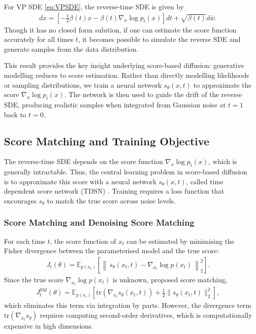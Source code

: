 \documentclass[a4paper,12pt]{article}
\begin{document}
For VP SDE \cref{eq:VPSDE}, the reverse-time SDE is given by
\begin{align*}
    dx=\left[-\frac{1}{2}\beta\!\left(t\right)x-\beta\!\left(t\right)\nabla_x \log p_t(x)\right]dt+\sqrt{\beta\!\left(t\right)}d\bar w.
\end{align*}
Though it has no closed form sulution, if one can estimate the score function accurately for all times \(t\), it becomes possible to simulate the reverse SDE and generate samples from the data distribution.

This result provides the key insight underlying score-based diffusion: generative modelling reduces to score estimation. 
Rather than directly modelling likelihoods or sampling distributions, we train a neural network \(s_\theta(x,t)\) to approximate the score \(\nabla_x \log p_t(x)\). The network is then used to guide the drift of the reverse SDE, producing realistic samples when integrated from Gaussian noise at \(t = 1\) back to \(t = 0\).

\subsection{Score Matching and Training Objective}
The reverse-time SDE depends on the score function \(\nabla_x \log p_t(x)\), which is generally intractable. Thus, the central learning problem in score-based diffusion is to approximate this score with a neural network \(s_\theta(x,t)\), called time dependent score network (TDSN) \citep{song2021ScoreBasedGenerativeModeling}. Training requires a loss function that encourages \(s_\theta\) to match the true score across noise levels.

\subsubsection{Score Matching and Denoising Score Matching}\label{sec:SM-and-DSM}
For each time \(t\), the score function of \(x_t\) can be estimated by minimising the Fisher divergence between the parameterised model and the true score:
\begin{align}\label{eq:FD}
    J_t(\theta)
    = \mathbb{E}_{p(x_t)}\!\left[\left\|\,s_\theta(x_t,t)-\nabla_{x_t}\log p(x_t)\,\right\|_2^2\right].
\end{align}
Since the true score $\nabla_{x_t}\log p(x_t)$ is unknown, \citet{hyvarinenEstimationNonNormalizedStatistical2005} proposed score matching,
\begin{align*}
    J_t^{\text{SM}}(\theta)
    = \mathbb{E}_{p(x_t)}\!\left[
        \mathrm{tr}\!\left(\nabla_{x_t} s_\theta(x_t,t)\right)
        + \frac{1}{2}\|s_\theta(x_t,t)\|_2^2
    \right],
\end{align*}
which eliminates this term via integration by parts. However, the divergence term $\mathrm{tr}(\nabla_{x_t}s_\theta)$ requires computing second-order derivatives, which is computationally expensive in high dimensions.
\end{document}
